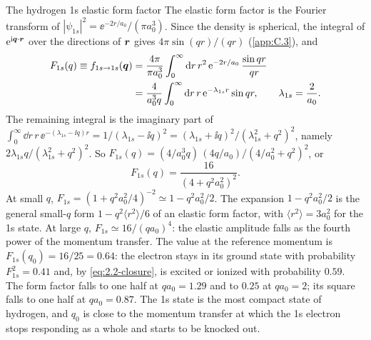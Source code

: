 \begin{workedexample}{The hydrogen 1s elastic form factor}\label{we:2-hydrogen}
The elastic form factor is the Fourier transform of $|\psi_{1s}|^2 = \ee^{-2r/a_0}/(\pi a_0^3)$. Since the density is spherical, the integral of $\mathrm{e}^{\mathrm{i}\bm{q}\cdot\bm{r}}$ over the directions of $\bm{r}$ gives $4\pi\sin(qr)/(qr)$ (\cref{app:C.3}), and
\begin{equation*}
  \begin{split}
  F_{1s}(q) \equiv f_{1s\to1s}(\bm{q}) &= \frac{4\pi}{\pi a_0^3}\int_0^\infty\mathrm{d} r\,r^2\,\mathrm{e}^{-2r/a_0}\,\frac{\sin qr}{qr}\\
  &= \frac{4}{a_0^3q}\int_0^\infty\mathrm{d} r\,r\,\mathrm{e}^{-\lambda_{1s}r}\sin qr , \qquad \lambda_{1s} = \frac{2}{a_0} .
  \end{split}
\end{equation*}
The remaining integral is the imaginary part of $\int_0^\infty\dd r\,r\,\ee^{-(\lambda_{1s} - \ii q)r} = 1/(\lambda_{1s} - \ii q)^2 = (\lambda_{1s} + \ii q)^2/(\lambda_{1s}^2 + q^2)^2$, namely $2\lambda_{1s}q/(\lambda_{1s}^2 + q^2)^2$. So $F_{1s}(q) = (4/a_0^3q)\,(4q/a_0)/(4/a_0^2 + q^2)^2$, or
\begin{equation}
  F_{1s}(q) = \frac{16}{(4 + q^2a_0^2)^2} .
  \label{eq:2.2-F1s}
\end{equation}
At small $q$, $F_{1s} = (1 + q^2a_0^2/4)^{-2} \simeq 1 - q^2a_0^2/2$. The expansion $1 - q^2a_0^2/2$ is the general small-$q$ form $1 - q^2\langle r^2\rangle/6$ of an elastic form factor, with $\langle r^2\rangle = 3a_0^2$ for the 1s state. At large $q$, $F_{1s} \simeq 16/(qa_0)^4$: the elastic amplitude falls as the fourth power of the momentum transfer. The value at the reference momentum is $F_{1s}(q_0) = 16/25 = 0.64$: the electron stays in its ground state with probability $F_{1s}^2 = 0.41$ and, by \cref{eq:2.2-closure}, is excited or ionized with probability $0.59$. The form factor falls to one half at $qa_0 = 1.29$ and to $0.25$ at $qa_0 = 2$; its square falls to one half at $qa_0 = 0.87$. The 1s state is the most compact state of hydrogen, and $q_0$ is close to the momentum transfer at which the 1s electron stops responding as a whole and starts to be knocked out.


\end{workedexample}
